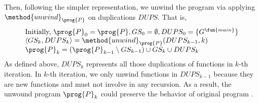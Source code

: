 Then, following the simpler representation, we unwind the program 
via applying $\method{unwind}_\prog{P}$ on duplications $DUPS$.
That is,
\[
\begin{array}{l}
\text{Initially, } \prog{P}_0 = \prog{P}, GS_0 = \emptyset,DUPS_0 = \{G^\fun{main}\} \\
\langle GS_k, DUPS_k \rangle = \method{unwind}_\prog{P}(DUPS_{k-1}, k)\\
\prog{P}_k = (\prog{P}_{k-1} \setminus GS_{k-1}) \cup GS_k \cup DUPS_k\\
\end{array}
\]
As defined above, $DUPS_k$ represents all those duplications of functions in
$k$-th iteration.
In $k$-th iteration, we only unwind functions in $DUPS_{k-1}$ because they are
new functions and must not involve in any recursion.
As a result, the unwound program $\prog{P}_k$ could preserve the behavior of
original program .


